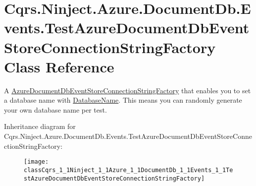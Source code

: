 \hypertarget{classCqrs_1_1Ninject_1_1Azure_1_1DocumentDb_1_1Events_1_1TestAzureDocumentDbEventStoreConnectionStringFactory}{}\section{Cqrs.\+Ninject.\+Azure.\+Document\+Db.\+Events.\+Test\+Azure\+Document\+Db\+Event\+Store\+Connection\+String\+Factory Class Reference}
\label{classCqrs_1_1Ninject_1_1Azure_1_1DocumentDb_1_1Events_1_1TestAzureDocumentDbEventStoreConnectionStringFactory}


A \hyperlink{classCqrs_1_1Azure_1_1DocumentDb_1_1Events_1_1AzureDocumentDbEventStoreConnectionStringFactory_a7503e00bedc6af5686ded0b6b7719a30_a7503e00bedc6af5686ded0b6b7719a30}{Azure\+Document\+Db\+Event\+Store\+Connection\+String\+Factory} that enables you to set a database name with \hyperlink{classCqrs_1_1Ninject_1_1Azure_1_1DocumentDb_1_1Events_1_1TestAzureDocumentDbEventStoreConnectionStringFactory_ad82e2485313ff7802ad125958173f3bf_ad82e2485313ff7802ad125958173f3bf}{Database\+Name}. This means you can randomly generate your own database name per test.  


Inheritance diagram for Cqrs.\+Ninject.\+Azure.\+Document\+Db.\+Events.\+Test\+Azure\+Document\+Db\+Event\+Store\+Connection\+String\+Factory\+:\begin{figure}[H]
\begin{center}
\leavevmode
\texttt{[image: classCqrs\_1\_1Ninject\_1\_1Azure\_1\_1DocumentDb\_1\_1Events\_1\_1TestAzureDocumentDbEventStoreConnectionStringFactory]}
\end{center}
\end{figure}
